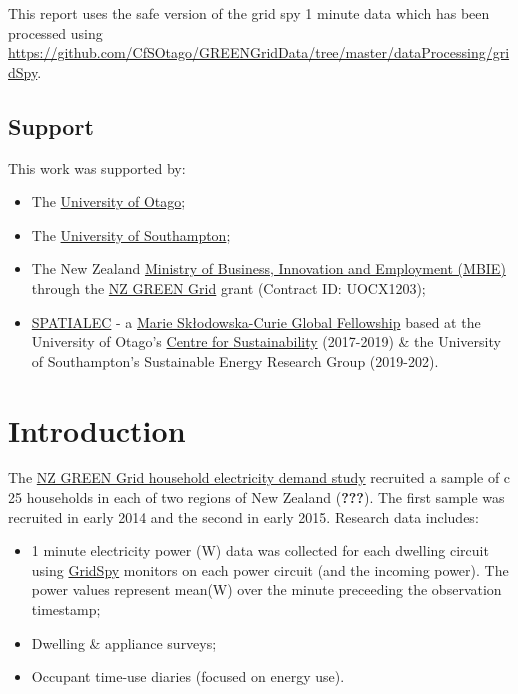 \documentclass[]{article}
\providecommand{\tightlist}{%
  \setlength{\itemsep}{0pt}\setlength{\parskip}{0pt}}
\theoremstyle{definition}
\theoremstyle{definition}
\theoremstyle{definition}
\theoremstyle{remark}
\begin{document}
This report uses the safe version of the grid spy 1 minute data which
has been processed using
\url{https://github.com/CfSOtago/GREENGridData/tree/master/dataProcessing/gridSpy}.

\subsection{Support}\label{support}

This work was supported by:

\begin{itemize}
\tightlist
\item
  The \href{https://www.otago.ac.nz/}{University of Otago};
\item
  The \href{https://www.southampton.ac.uk/}{University of Southampton};
\item
  The New Zealand \href{http://www.mbie.govt.nz/}{Ministry of Business,
  Innovation and Employment (MBIE)} through the
  \href{https://www.otago.ac.nz/centre-sustainability/research/energy/otago050285.html}{NZ
  GREEN Grid} grant (Contract ID: UOCX1203);
\item
  \href{http://www.energy.soton.ac.uk/tag/spatialec/}{SPATIALEC} - a
  \href{http://ec.europa.eu/research/mariecurieactions/about-msca/actions/if/index_en.htm}{Marie
  Skłodowska-Curie Global Fellowship} based at the University of Otago's
  \href{http://www.otago.ac.nz/centre-sustainability/staff/otago673896.html}{Centre
  for Sustainability} (2017-2019) \& the University of Southampton's
  Sustainable Energy Research Group (2019-202).
\end{itemize}

\newpage

\section{Introduction}\label{introduction}

The \href{https://cfsotago.github.io/GREENGridData/}{NZ GREEN Grid
household electricity demand study} recruited a sample of c 25
households in each of two regions of New Zealand ({\textbf{???}}). The
first sample was recruited in early 2014 and the second in early 2015.
Research data includes:

\begin{itemize}
\tightlist
\item
  1 minute electricity power (W) data was collected for each dwelling
  circuit using \href{https://gridspy.com/}{GridSpy} monitors on each
  power circuit (and the incoming power). The power values represent
  mean(W) over the minute preceeding the observation timestamp;
\item
  Dwelling \& appliance surveys;
\item
  Occupant time-use diaries (focused on energy use).
\end{itemize}
\end{document}
